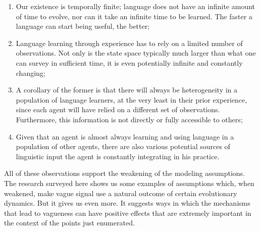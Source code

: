 \documentclass[a4paper]{article}
\begin{document}
\begin{enumerate}
\item Our existence is temporally finite; language does not have an infinite amount of time to evolve, nor can it take an infinite time to be learned. The faster a language can start being useful, the better;
\item Language learning through experience has to rely on a limited number of observations. Not only is the state space typically much larger than what one can survey in sufficient time, it is even potentially infinite and constantly changing;
\item A corollary of the former is that there will always be heterogeneity in a population of language learners, at the very least in their prior experience, since each agent will have relied on a different set of observations. Furthermore, this information is not directly or fully accessible to others;
\item Given that an agent is almost always learning and using language in a population of other agents, there are also various potential sources of linguistic input the agent is constantly integrating in his practice.
\end{enumerate}
All of these observations support the weakening of the modeling assumptions.
The research surveyed here shows us some examples of assumptions which, when weakened, make vague signal use a natural outcome of certain evolutionary dynamics.
But it gives us even more.
It suggests ways in which the mechanisms that lead to vagueness can have positive effects that are extremely important in the context of the points just enumerated.
\end{document}
